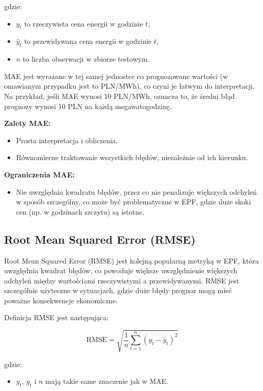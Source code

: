 gdzie:
\begin{itemize}
    \item \( y_t \) to rzeczywista cena energii w godzinie \( t \),
    \item \( \hat{y}_t \) to przewidywana cena energii w godzinie \( t \),
    \item \( n \) to liczba obserwacji w zbiorze testowym.
\end{itemize}

MAE jest wyrażane w tej samej jednostce co prognozowane wartości (w omawianym przypadku jest to PLN/MWh), co czyni je łatwym do interpretacji. Na przykład, jeśli MAE wynosi 10 PLN/MWh, oznacza to, że średni błąd prognozy wynosi 10 PLN na każdą megawatogodzinę.

\textbf{Zalety MAE:}
\begin{itemize}
    \item Prosta interpretacja i obliczenia.
    \item Równomierne traktowanie wszystkich błędów, niezależnie od ich kierunku.
\end{itemize}

\textbf{Ograniczenia MAE:}
\begin{itemize}
    \item Nie uwzględnia kwadratu błędów, przez co nie penalizuje większych odchyleń w sposób szczególny, co może być problematyczne w EPF, gdzie duże skoki cen (np. w godzinach szczytu) są istotne.
\end{itemize}

\subsection{Root Mean Squared Error (RMSE)}
\label{subsec:rmse}

Root Mean Squared Error (RMSE) jest kolejną popularną metryką w EPF, która uwzględnia kwadrat błędów, co powoduje większe uwzględnienie większych odchyleń między wartościami rzeczywistymi a przewidywanymi. RMSE jest szczególnie użyteczne w sytuacjach, gdzie duże błędy prognoz mogą mieć poważne konsekwencje ekonomiczne.

Definicja RMSE jest następująca:

\[
\text{RMSE} = \sqrt{\frac{1}{n} \sum_{t=1}^{n} \left( y_t - \hat{y}_t \right)^2}
\]

gdzie:
\begin{itemize}
    \item \( y_t \), \( \hat{y}_t \) i \( n \) mają takie same znaczenie jak w MAE.
\end{itemize}


